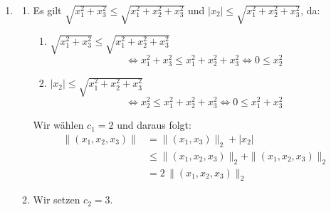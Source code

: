 \documentclass[a4paper,12pt]{article}
\begin{document}
\begin{enumerate}[label=\alph*)]
\begin{enumerate}[label=(\roman*)]
        \item
        $\forall x, y \in \mathbb{R}^3 : \|x + y\| \leq \|x\| + \|y\|$
        \begin{align*}
            \|x + y\| &= \|(x_1 + y_1, x_3 + y_3)\|_2 + |x_2 + y_2| \\
                      &\leq \bigl(\|(x_1, x_3)\|_2 + \|(y_1, y_3)\|_2\bigr)
                            + \bigl(|x_2| + |y_2|\bigr) \\
                      &= \bigl(\|(x_1, x_3)\|_2 + |x_2|\bigr)
                         + \bigl(\|(y_1, y_3)\|_2 + |y_2|\bigr) \\
                      &= \|x\| + \|y\|
        \end{align*}

    \end{enumerate}

    \item
    \begin{enumerate}[label=(\roman*)]

        \item
        Es gilt $\sqrt{x_1^2 + x_3^2} \leq \sqrt{x_1^2 + x_2^2 + x_3^2}$
        und $|x_2| \leq \sqrt{x_1^2 + x_2^2 + x_3^2}$, da:

        \begin{enumerate}[label=\arabic*.]
            \item
            $\sqrt{x_1^2 + x_3^2} \leq \sqrt{x_1^2 + x_2^2 + x_3^2}$
            \[
                \Longleftrightarrow x_1^2 + x_3^2 \leq x_1^2 + x_2^2 + x_3^2
                \Longleftrightarrow 0 \leq x_2^2
            \]

            \item
            $|x_2| \leq \sqrt{x_1^2 + x_2^2 + x_3^2}$
            \[
                \Longleftrightarrow x_2^2 \leq x_1^2 + x_2^2 + x_3^2
                \Longleftrightarrow 0 \leq x_1^2 + x_3^2
            \]
        \end{enumerate}

        Wir wählen $c_1 = 2$ und daraus folgt:
        \begin{align*}
            \|(x_1, x_2, x_3)\| &= \|(x_1, x_3)\|_2 + |x_2| \\
                                 &\leq \|(x_1, x_2, x_3)\|_2 + \|(x_1, x_2, x_3)\|_2 \\
                                 &= 2\,\|(x_1, x_2, x_3)\|_2
        \end{align*}

        \item
        Wir setzen $c_2 = 3$.


\end{enumerate}
\end{enumerate}
\end{document}
